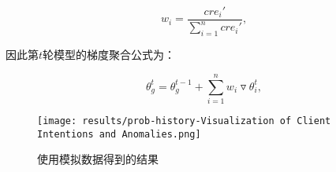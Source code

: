 \documentclass[lettersize,journal]{IEEEtran}
\begin{document}
\begin{enumerate}
\begin{equation}
    w_i=\frac{cre_i'}{\sum_{i=1}^{n}cre_i'},
\end{equation}

因此第$t$轮模型的梯度聚合公式为：

\begin{equation}
    \theta_g^t = \theta_g^{t-1}+\sum_{i=1}^{n}w_i\triangledown \theta_i^t,
\end{equation}

\begin{figure}[!t]
    \centering
    \texttt{[image: results/prob-history-Visualization of Client Intentions and Anomalies.png]}
    \centering \caption{使用模拟数据得到的结果}
    \label{fig:result-of-histry}
\end{figure}












\end{enumerate}
\end{document}
